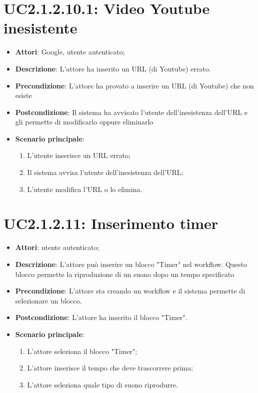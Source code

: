 \section{UC2.1.2.10.1: Video Youtube inesistente}
\label{UC2.1.2.10.1}
\begin{itemize}
	\item \textbf{Attori}: Google, utente autenticato;
	\item \textbf{Descrizione}: L'attore ha inserito un URL (di Youtube) errato.
	\item \textbf{Precondizione}: L'attore ha provato a inserire un URL (di Youtube) che non esiste
	\item \textbf{Postcondizione}: Il sistema ha avvisato l'utente dell'inesistenza dell'URL e gli permette di modificarlo oppure eliminarlo
	\item \textbf{Scenario principale}:
	\begin{enumerate} \item L'utente inserisce un URL errato;  \item  Il sistema avvisa l'utente dell'inesistenza dell'URL;  \item  L'utente modifica l'URL o lo elimina.\end{enumerate}
\end{itemize}

\section{UC2.1.2.11: Inserimento timer}
\label{UC2.1.2.11}
\begin{itemize}
	\item \textbf{Attori}: utente autenticato;
	\item \textbf{Descrizione}: L'attore può inserire un blocco "Timer" nel workflow. Questo blocco permette la riproduzione di un suono dopo un tempo specificato
	\item \textbf{Precondizione}: L'attore sta creando un workflow e il sistema permette di selezionare un blocco.
	\item \textbf{Postcondizione}: L'attore ha inserito il blocco "Timer".
	\item \textbf{Scenario principale}:
	\begin{enumerate} \item L'attore seleziona il blocco "Timer";  \item  L'attore inserisce il tempo che deve trascorrere prima;  \item  L'attore seleziona quale tipo di suono riprodurre.\end{enumerate}
\end{itemize}

